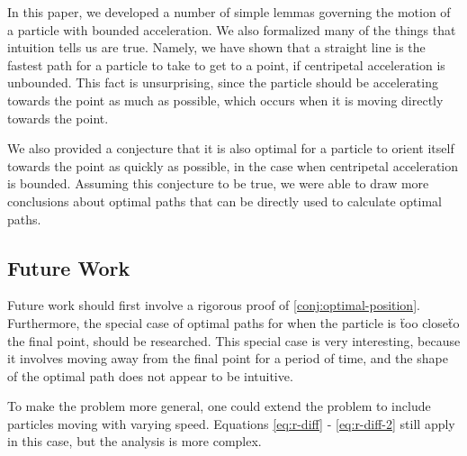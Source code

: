 In this paper, we developed a number of simple lemmas governing the motion of a particle with bounded acceleration. We also formalized many of the things that intuition tells us are true. Namely, we have shown that a straight line is the fastest path for a particle to take to get to a point, if centripetal acceleration is unbounded. This fact is unsurprising, since the particle should be accelerating towards the point as much as possible, which occurs when it is moving directly towards the point. 

We also provided a conjecture that it is also optimal for a particle to orient itself towards the point as quickly as possible, in the case when centripetal acceleration is bounded. Assuming this conjecture to be true, we were able to draw more conclusions about optimal paths that can be directly used to calculate optimal paths.

\subsection{Future Work}

Future work should first involve a rigorous proof of \ref{conj:optimal-position}. Furthermore, the special case of optimal paths for when the particle is \"too close\" to the final point, should be researched. This special case is very interesting, because it involves moving away from the final point for a period of time, and the shape of the optimal path does not appear to be intuitive.

To make the problem more general, one could extend the problem to include particles moving with varying speed. Equations \ref{eq:r-diff} - \ref{eq:r-diff-2} still apply in this case, but the analysis is more complex. 
